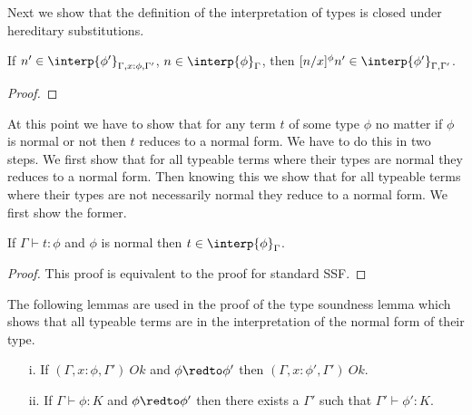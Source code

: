 \noindent 
Next we show that the definition of the interpretation of types is closed under
hereditary substitutions.  

\begin{lemma}
  If $n' \in \interp{\phi'}_{\Gamma,x:\phi,\Gamma'}$, $n \in \interp{\phi}_\Gamma$, then 
  $[n/x]^\phi n' \in \interp{\phi'}_{\Gamma,\Gamma'}$.
  
  \label{lemma:interpretation_of_types_closed_substitution_stlc}
\end{lemma}
\begin{proof}
  
\end{proof}
At this point we have to show that for any term $t$ of some type
$\phi$ no matter if $\phi$ is normal or not then $t$ reduces to a
normal form. We have to do this in two steps.  We first show that for
all typeable terms where their types are normal they reduces to a
normal form.  Then knowing this we show that for all typeable terms
where their types are not necessarily normal they reduce to a normal
form.  We first show the former.
\begin{thm}
  If $\Gamma \vdash t:\phi$ and $\phi$ is normal then $t \in \interp{\phi}_\Gamma$.
  \label{thm:soundness__normal_ssfw}
\end{thm}
\begin{proof}
  This proof is equivalent to the proof for standard SSF.
\end{proof}
\noindent
The following lemmas are used in the proof of the type soundness lemma
which shows that all typeable terms are in the interpretation of the
normal form of their type.
\begin{lemma}
  \label{lemma:preservation_for_kinding_ssfw}
  \begin{itemize}
  \item[]
  \item[i.] If $(\Gamma,x:\phi,\Gamma')\ Ok$ and $\phi \redto \phi'$ then $(\Gamma,x:\phi',\Gamma')\ Ok$.
  \item[ii.] If $\Gamma \vdash \phi:K$ and $\phi \redto \phi'$ then there exists a $\Gamma'$ such that $\Gamma' \vdash \phi':K$.
  \end{itemize}
\end{lemma}
